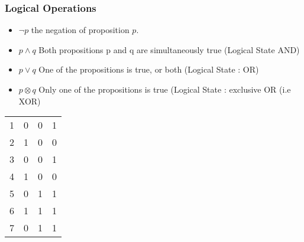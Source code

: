 \documentclass{beamer}
\begin{document}
\begin{frame}
\frametitle{Logical Operations}
\begin{itemize}
\item $\neg p$ the negation of proposition $p$.
\item $p \wedge q$ Both propositions p and q are simultaneously true (Logical State AND)
\item $p \vee q $ One of the propositions is true, or both (Logical State : OR)
\item $p \otimes q$ Only one of the propositions is true (Logical State : exclusive OR (i.e XOR)
\end{itemize}
\end{frame}

\begin{frame}
\begin{tabular}{|c|c|c|c|}
\hline
	&		&		&		\\ \hline
1	&	0	&	0	&	1	\\ \hline
2	&	1	&	0	&	0	\\ \hline
3	&	0	&	0	&	1	\\ \hline
4	&	1	&	0	&	0	\\ \hline
5	&	0	&	1	&	1	\\ \hline
6	&	1	&	1	&	1	\\ \hline
7	&	0	&	1	&	1	\\ \hline

\end{tabular} 
\end{frame}
\end{document}

